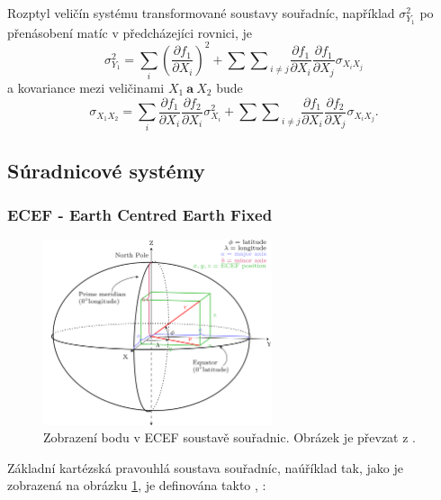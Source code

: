 Rozptyl veličín systému transformované soustavy souřadníc, například $\sigma_{Y_{1}}^{2}$ po přenásobení matíc v předcházejíci rovnici, je 
\begin{equation}
\sigma_{Y_{1}}^{2} = \sum_{i}\left(\dfrac{\partial f_{1}}{\partial X_{i}}\right)^{2} + {\sum\sum}_{i\neq j}\dfrac{\partial f_{1}}{\partial X_{i}}\dfrac{\partial f_{1}}{\partial X_{j}}\sigma_{X_{i}X_{j}}
\end{equation}
a kovariance mezi veličinami $X_{1}\ \textbf{a}\ X_{2}$ bude
\begin{equation}
\sigma_{X_{1}X_{2}} = \sum_{i} {\dfrac{\partial f_{1}}{\partial X_{i}}\dfrac{\partial f_{2}}{\partial X_{i}}\sigma_{X_{i}}^{2}} + {\sum\sum}_{i\neq j}\dfrac{\partial f_{1}}{\partial X_{i}}\dfrac{\partial f_{2}}{\partial X_{j}}\sigma_{X_{i}X_{j}}.
\end{equation}

\newpage
\subsection{Súradnicové systémy}


\subsubsection{ECEF - Earth Centred Earth Fixed}

\begin{figure}[ht!]
\begin{center}

\includegraphics[width=0.60\textwidth]{FIG/ecef_wiki}
\caption{Zobrazení bodu v ECEF soustavě souřadnic. Obrázek je převzat z \cite{ecefWiki}.}
\label{fig:ecef}
\end{center}
\end{figure}

Základní kartézská pravouhlá soustava souřadníc, naúříklad tak, jako je zobrazená na obrázku \ref{fig:ecef}, je definována takto \cite{Soler1988}, \cite{Kovar2016}:

